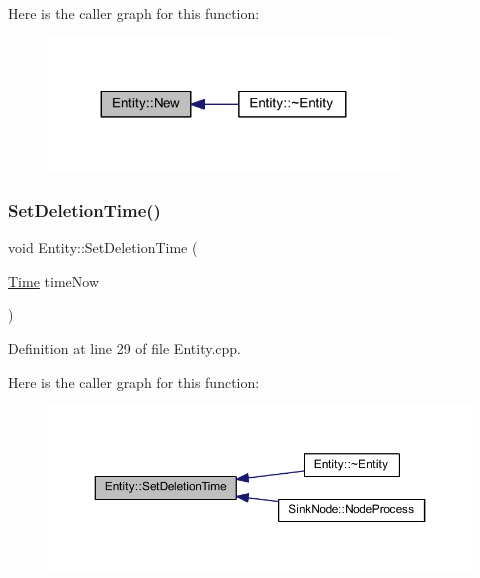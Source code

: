 Here is the caller graph for this function\+:\nopagebreak
\begin{figure}[H]
\begin{center}
\leavevmode
\includegraphics[width=263pt]{class_entity_ab8dc894a31d5c72219fa070345d7c383_icgraph}
\end{center}
\end{figure}
\mbox{\label{class_entity_a5c0dc393f667e2af24cd11d7b4bbd82c}} 
\subsubsection{\texorpdfstring{Set\+Deletion\+Time()}{SetDeletionTime()}}
{\footnotesize\ttfamily void Entity\+::\+Set\+Deletion\+Time (\begin{DoxyParamCaption}\item[{\hyperlink{_simulation_executive_8h_ac2d3e0ba793497bcca555c7c2cf64ff3}{Time}}]{time\+Now }\end{DoxyParamCaption})}



Definition at line 29 of file Entity.\+cpp.

Here is the caller graph for this function\+:\nopagebreak
\begin{figure}[H]
\begin{center}
\leavevmode
\includegraphics[width=350pt]{class_entity_a5c0dc393f667e2af24cd11d7b4bbd82c_icgraph}
\end{center}
\end{figure}
\mbox{\label{class_entity_ad08cf1231dbd8127e086bb803bdb3d5a}} 
